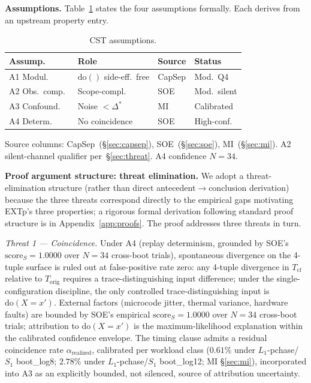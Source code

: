 \documentclass[conference]{IEEEtran}
\newcommand{\Korig}{T_\text{orig}}
\newcommand{\Tcf}{T_\text{cf}}
\newcommand{\Dstar}{\Delta^{*}}
\newcommand{\arealized}{\alpha_\text{realized}}
\newcommand{\scoreS}{\text{score}_S}
\newcommand{\dox}[1]{\text{do}(X{=}#1)}
\begin{document}
\textbf{Assumptions.} Table~\ref{tab:assumptions} states the four
assumptions formally. Each derives from an upstream property entry.

\begin{table}[tb]
  \caption{CST assumptions.}
  \label{tab:assumptions}
  \centering
  \small
  \begin{tabular}{@{}p{}p{}p{}p{}@{}}
  \toprule
  Assump.\ & Role & Source & Status \\
  \midrule
  A1 Modul.\           & $\text{do}()$ side-eff.\ free & CapSep
                       & Mod.\ Q4 \\
  A2 Obs.\ comp.\      & Scope-compl.\                 & SOE
                       & Mod.\ silent \\
  A3 Confound.\        & Noise $<\Dstar$               & MI
                       & Calibrated \\
  A4 Determ.\          & No coincidence                & SOE
                       & High-conf. \\
  \bottomrule
  \end{tabular}

  \vspace{0.3em}
  \footnotesize{Source columns: CapSep~(\S\ref{sec:capsep}),
  SOE~(\S\ref{sec:soe}), MI~(\S\ref{sec:mi}). A2 silent-channel
  qualifier per~\S\ref{sec:threat}. A4 confidence $N{=}34$.}
\end{table}

\textbf{Proof argument structure: threat elimination.} We adopt a
threat-elimination structure (rather than direct
antecedent$\rightarrow$conclusion derivation) because the three
threats correspond directly to the empirical gaps motivating EXTp's
three properties; a rigorous formal derivation following standard
proof structure is in Appendix~\ref{app:proofs}. The proof addresses
three threats in turn.

\emph{Threat 1 --- Coincidence.} Under A4 (replay determinism,
grounded by SOE's $\scoreS = 1.0000$ over $N{=}34$ cross-boot
trials), spontaneous divergence on the 4-tuple surface is ruled out
at false-positive rate zero: any 4-tuple divergence in $\Tcf$
relative to $\Korig$ requires a trace-distinguishing input
difference; under the single-configuration discipline, the only
controlled trace-distinguishing input is $\dox{x'}$. External
factors (microcode jitter, thermal variance, hardware faults) are
bounded by SOE's empirical $\scoreS = 1.0000$ over $N{=}34$
cross-boot trials; attribution to $\dox{x'}$ is the
maximum-likelihood explanation within the calibrated confidence
envelope. The timing clause admits a residual coincidence rate
$\arealized$, calibrated per workload class ($0.61\%$ under
$L_1$-pchase/$S_1$ boot\_log8; $2.78\%$ under $L_1$-pchase/$S_1$
boot\_log12; MI \S\ref{sec:mi}), incorporated into A3 as an
explicitly bounded, not silenced, source of attribution uncertainty.
\end{document}
